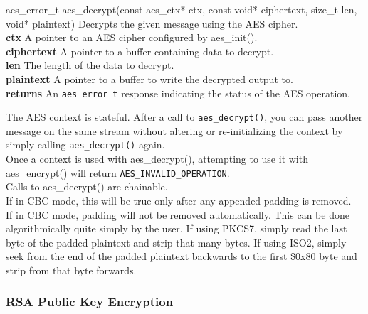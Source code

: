 \documentclass[titlepage]{article}
\begin{document}
				\begin{functionspec}[]{aes\_error\_t aes\_decrypt(const aes\_ctx* ctx, const void* ciphertext, size\_t len,\\\tabto{40mm}void* plaintext)}
				Decrypts the given message using the AES cipher.\\
				\textbf{ctx} A pointer to an AES cipher configured by aes\_init().\\
				\textbf{ciphertext} A pointer to a buffer containing data to decrypt.\\
				\textbf{len} The length of the data to decrypt.\\
				\textbf{plaintext} A pointer to a buffer to write the decrypted output to.\\
				\textbf{returns} An \texttt{aes\_error\_t} response indicating the status of the AES operation.
					\begin{notespec}
					The AES context is stateful. After a call to \texttt{aes\_decrypt()}, you can pass another message on the same stream without altering or re-initializing the context by simply calling \texttt{aes\_decrypt()} again.\\
					Once a context is used with aes\_decrypt(), attempting to use it with aes\_encrypt() will return \texttt{AES\_INVALID\_OPERATION}.\\
					Calls to aes\_decrypt() are chainable. \\If in CBC mode, this will be true only after any appended padding is removed.\\
					If in CBC mode, padding will not be removed automatically. This can be done algorithmically quite simply by the user. If using PKCS7, simply read the last byte of the padded plaintext and strip that many bytes. If using ISO2, simply seek from the end of the padded plaintext backwards to the first \$0x80 byte and strip from that byte forwards.
				\end{notespec}
			\end{functionspec}
		
		\subsubsection{RSA Public Key Encryption}
		
\end{document}
